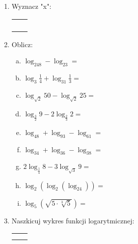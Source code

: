 \documentclass[12pt,a4paper]{article}
\begin{document}
\begin{enumerate}[1.]
\begin{enumerate}[a)]
\begin{tabular}{p{7cm} p{7cm}}
	\end{tabular} \end{enumerate}

	\newpage
	
	\item Wyznacz "x":
	
	\begin{enumerate}[a)] \begin{tabular}{p{7cm} p{7cm}}
			\item $\log_{0,5}x=-1$& \vspace{0.4cm}\item $\log_3x=3$ \\
			\item $\log_x16=4$& \item$\log_\frac{1}{3}x=2$ \\
			\item $\log_x8=-3$& \item$\log_x\sqrt{3}=1$ \\
			\item $\log_7x=0$& \item$\log_x4\sqrt{2}=-5$ \\
			
	\end{tabular} \end{enumerate}

	\item Oblicz:
	
	\begin{enumerate}[a)] 
		\item $\log_248-\log_23=$
		\item $\log_3\frac{1}{4}+\log_31\frac{1}{3}=$
		\item $\log_{\sqrt{2}}50 - \log_{\sqrt{2}}25=$
		\item $\log_\frac{3}{2}9-2\log_\frac{2}{3}2=$
		\item $\log_48+\log_93-\log_61=$
		\item $\log_34+\log_36-\log_38=$
		\item $2\log_\frac{1}{4}8 - 3\log_{\sqrt{3}}9=$
		\item $\log_2(\log_2(\log_24))=$	
		\item $\log_5(\sqrt{5\cdot\sqrt[3]{5}})=$
		
	\end{enumerate}

	\item Naszkicuj wykres funkcji logarytmicznej:
	
	\begin{enumerate}[a)] \begin{tabular}{p{7cm} p{7cm}}
			\item $f(x)=\log_2x$& \vspace{0.4cm}\item $g(x)=\log_\frac{1}{3}x$ \\
			\item $h(x)=\log_2(x-3)+2$& \item$i(x)=\log_2(\frac{1}{x})$ \\
	\end{tabular} \end{enumerate}
		
	\end{enumerate}
\end{document}
